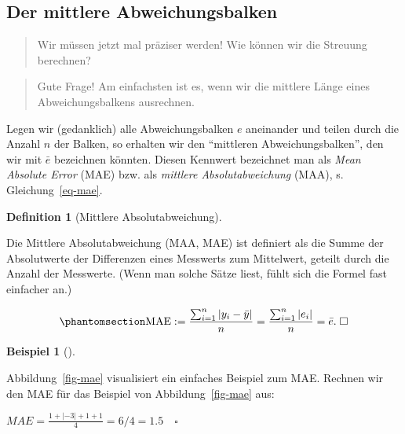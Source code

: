 \documentclass[
  letterpaper,
  twoside,
  open=any]{scrbook}
\theoremstyle{definition}
\theoremstyle{definition}
\newtheorem{example}{Beispiel}[chapter]
\theoremstyle{definition}
\newtheorem{definition}{Definition}[chapter]
\theoremstyle{remark}
\begin{document}
\subsection{Der mittlere
Abweichungsbalken}\label{der-mittlere-abweichungsbalken}

\begin{quote}
{} Wir müssen jetzt mal präziser werden! Wie können wir
die Streuung berechnen?
\end{quote}

\begin{quote}
{} Gute Frage! Am einfachsten ist es, wenn wir die
mittlere Länge eines Abweichungsbalkens ausrechnen.
\end{quote}

Legen wir (gedanklich) alle Abweichungsbalken \(e\) aneinander und
teilen durch die Anzahl \(n\) der Balken, so erhalten wir den
\enquote{mittleren Abweichungsbalken}, den wir mit \(\bar{e}\)
bezeichnen könnten. Diesen Kennwert bezeichnet man als \emph{Mean
Absolute Error} (MAE) bzw. als \emph{mittlere Absolutabweichung} (MAA),
s. Gleichung~\ref{eq-mae}.

\begin{definition}[Mittlere
Absolutabweichung]\protect\hypertarget{def-mae}{}\label{def-mae}

Die Mittlere Absolutabweichung (MAA, MAE) ist definiert als die Summe
der Absolutwerte der Differenzen eines Messwerts zum Mittelwert, geteilt
durch die Anzahl der Messwerte. (Wenn man solche Sätze liest, fühlt sich
die Formel fast einfacher an.)

\begin{equation}\phantomsection\label{eq-mae}{{\displaystyle \mathrm {MAE} :={\frac {\sum _{i=1}^{n}\left|y_{i}-\bar{y}\right|}{n}}={\frac {\sum _{i=1}^{n}\left|e_{i}\right|}{n}}=\bar{e}.  \; \square}}\end{equation}

\end{definition}

\begin{example}[]\protect\hypertarget{exm-mae}{}\label{exm-mae}

Abbildung~\ref{fig-mae} visualisiert ein einfaches Beispiel zum MAE.
Rechnen wir den MAE für das Beispiel von Abbildung~\ref{fig-mae} aus:

\(MAE = \frac{1 + |- 3| + 1 + 1}{4} = 6/4 = 1.5 \quad \square\)

\end{example}
\end{document}
